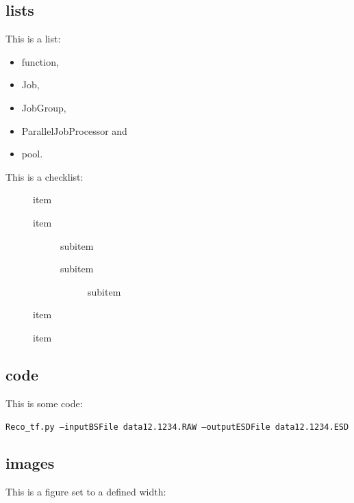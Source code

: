 \subsection{lists}

This is a list:

\begin{itemize}
\item function,
\item Job,
\item JobGroup,
\item ParallelJobProcessor and
\item pool.
\end{itemize}

\newpage

This is a checklist:

\begin{description}
\item[\Checkmark] item
\item[\Checkmark] item
    \begin{description}
    \item[\Checkmark] subitem
    \item[\Checkmark] subitem
        \begin{description}
        \item[\Checkmark] subitem
        \end{description}
    \end{description}
\item[\Checkmark] item
\item[\XSolidBrush] item
\end{description}

\subsection{code}

This is some code:

\begin{center}
\footnotesize\texttt{Reco\_tf.py --inputBSFile data12.1234.RAW --outputESDFile data12.1234.ESD}
\end{center}

\subsection{images}

This is a figure set to a defined width:

